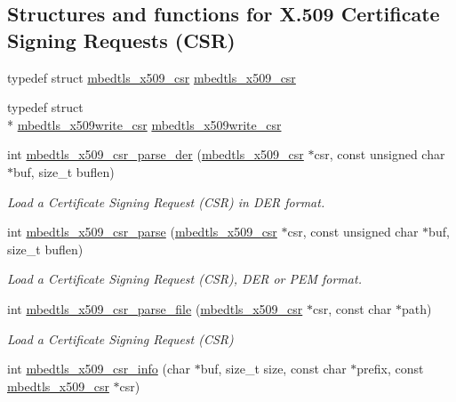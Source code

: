 \subsection*{Structures and functions for X.509 Certificate Signing Requests (C\-S\-R)}
\begin{DoxyCompactItemize}
\item 
typedef struct \hyperlink{structmbedtls__x509__csr}{mbedtls\-\_\-x509\-\_\-csr} \hyperlink{group__x509__module_gae481b23df67001bdac96ef9c2ab3ef7c}{mbedtls\-\_\-x509\-\_\-csr}
\item 
typedef struct \\*
\hyperlink{structmbedtls__x509write__csr}{mbedtls\-\_\-x509write\-\_\-csr} \hyperlink{group__x509__module_ga7b0b4f8c5cfd541ee20c53907edb636d}{mbedtls\-\_\-x509write\-\_\-csr}
\item 
int \hyperlink{group__x509__module_ga4c58fa3804ea9feb1acf745221f17208}{mbedtls\-\_\-x509\-\_\-csr\-\_\-parse\-\_\-der} (\hyperlink{structmbedtls__x509__csr}{mbedtls\-\_\-x509\-\_\-csr} $\ast$csr, const unsigned char $\ast$buf, size\-\_\-t buflen)
\begin{DoxyCompactList}\small\item\em Load a Certificate Signing Request (C\-S\-R) in D\-E\-R format. \end{DoxyCompactList}\item 
int \hyperlink{group__x509__module_ga53012fb8859f4835ccfb0a5e359b3176}{mbedtls\-\_\-x509\-\_\-csr\-\_\-parse} (\hyperlink{structmbedtls__x509__csr}{mbedtls\-\_\-x509\-\_\-csr} $\ast$csr, const unsigned char $\ast$buf, size\-\_\-t buflen)
\begin{DoxyCompactList}\small\item\em Load a Certificate Signing Request (C\-S\-R), D\-E\-R or P\-E\-M format. \end{DoxyCompactList}\item 
int \hyperlink{group__x509__module_gaf49db7323eee45d9649600de18d715f8}{mbedtls\-\_\-x509\-\_\-csr\-\_\-parse\-\_\-file} (\hyperlink{structmbedtls__x509__csr}{mbedtls\-\_\-x509\-\_\-csr} $\ast$csr, const char $\ast$path)
\begin{DoxyCompactList}\small\item\em Load a Certificate Signing Request (C\-S\-R) \end{DoxyCompactList}\item 
int \hyperlink{group__x509__module_gaeec330c8cb351adc2870f4f088f36fdc}{mbedtls\-\_\-x509\-\_\-csr\-\_\-info} (char $\ast$buf, size\-\_\-t size, const char $\ast$prefix, const \hyperlink{structmbedtls__x509__csr}{mbedtls\-\_\-x509\-\_\-csr} $\ast$csr)

\end{DoxyCompactItemize}
